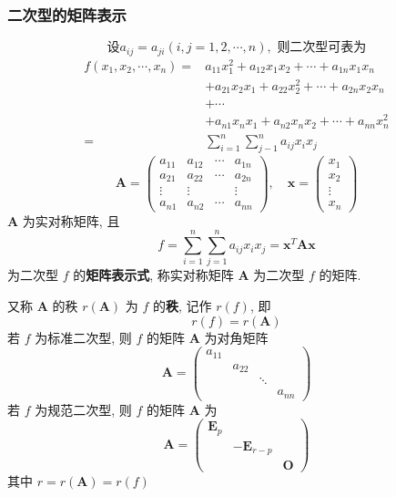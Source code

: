 \documentclass{article}
\begin{document}
				\subsubsection*{二次型的矩阵表示}
					$$
					\text {设} a_{i j}=a_{j i}(i, j=1,2, \cdots, n), \text { 则二次型可表为}
					$$
					$$
					\begin{aligned}
						f\left(x_{1}, x_{2}, \cdots, x_{n}\right)=& a_{11} x_{1}^{2}+a_{12} x_{1} x_{2}+\cdots+a_{1 n} x_{1} x_{n} \\
						&+a_{21} x_{2} x_{1}+a_{22} x_{2}^{2}+\cdots+a_{2 n} x_{2} x_{n} \\
						&+\cdots \\
						&+a_{n 1} x_{n} x_{1}+a_{n 2} x_{n} x_{2}+\cdots+a_{n n} x_{n}^{2} \\
						=& \sum_{i=1}^{n} \sum_{j-1}^{n} a_{i j} x_{i} x_{j}
					\end{aligned}
					$$
					$$
					\boldsymbol{A}=\left(\begin{array}{cccc}
						a_{11} & a_{12} & \cdots & a_{1 n} \\
						a_{21} & a_{22} & \cdots & a_{2 n} \\
						\vdots & \vdots & & \vdots \\
						a_{n 1} & a_{n 2} & \cdots & a_{n n}
					\end{array}\right), \quad \boldsymbol{x}=\left(\begin{array}{c}
						x_{1} \\
						x_{2} \\
						\vdots \\
						x_{n}
					\end{array}\right)
					$$
					$\boldsymbol{A}$ 为实对称矩阵, 且
					$$
					f=\sum_{i=1}^{n} \sum_{j=1}^{n} a_{i j} x_{i} x_{j}=\boldsymbol{x}^{T} \boldsymbol{A} \boldsymbol{x}
					$$
					为二次型 $f$ 的\textbf{矩阵表示式}, 称实对称矩阵 $\boldsymbol{A}$ 为二次型 $f$ 的矩阵.

					又称 $\boldsymbol{A}$ 的秩 $r(\boldsymbol{A})$ 为 $f$ 的\textbf{秩}, 记作 $r(f)$, 即
					$$
					r(f)=r(\boldsymbol{A})
					$$
					若 $f$ 为标准二次型, 则 $f$ 的矩阵 $\boldsymbol{A}$ 为对角矩阵
					$$
					\boldsymbol{A}=\left(\begin{array}{llll}
						a_{11} & & & \\
						& a_{22} & & \\
						& & \ddots & \\
						& & & a_{n n}
					\end{array}\right)
					$$
					若 $f$ 为规范二次型, 则 $f$ 的矩阵 $\boldsymbol{A}$ 为
					$$
					\boldsymbol{A}=\left(\begin{array}{lll}
						\boldsymbol{E}_{p} & & \\
						& -\boldsymbol{E}_{r-p} & \\
						& & \boldsymbol{O}
					\end{array}\right)
					$$
					其中 $r=r(\boldsymbol{A})=r(f)$
\end{document}
